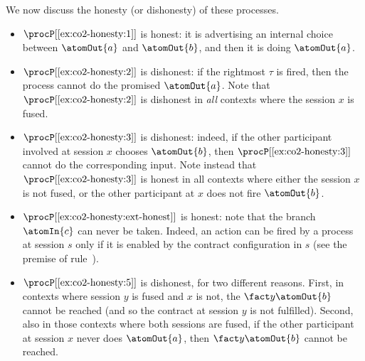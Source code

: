 \begin{example}
\begin{enumerate}
		
	\end{enumerate}
	We now discuss the honesty (or dishonesty) of these processes.
	\begin{itemize}
		
		\item $\procP[\ref*{ex:co2-honesty:1}]$ is honest:
		it is advertising an internal choice between $\atomOut{a}$ and $\atomOut{b}$,
		and then it is doing $\atomOut{a}$.
		
		\item $\procP[\ref*{ex:co2-honesty:2}]$ is dishonest:
		if the rightmost $\tau$ is fired, then the process cannot do the promised $\atomOut{a}$.
		Note that $\procP[\ref*{ex:co2-honesty:2}]$ is dishonest in \emph{all}
		contexts where the session $x$ is fused.
		
		\item $\procP[\ref*{ex:co2-honesty:3}]$ is dishonest:
		indeed, if the other participant involved at session $x$ chooses $\atomOut{b}$,
		then $\procP[\ref*{ex:co2-honesty:3}]$ cannot do the corresponding input.
		Note instead that $\procP[\ref*{ex:co2-honesty:3}]$ is honest in all 
		contexts where either the session $x$ is not fused,
		or the other participant at $x$ does not fire $\atomOut{b}$.
		
		\item $\procP[\ref*{ex:co2-honesty:ext-honest}]$ is honest:
		note that the branch $\atomIn{c}$ can never be taken.
		Indeed, an action can be fired by a process at session $s$
		only if it is enabled by the contract configuration in $s$
		(see the premise of rule~\nrule{[Do$\qmark$]}).
		
		\item $\procP[\ref*{ex:co2-honesty:5}]$ is dishonest,
		for two different reasons.
		First, in contexts where session $y$ is fused and $x$ is not, 
		the $\fact y {\atomOut{b}}$ cannot be reached 
		(and so the contract at session $y$ is not fulfilled).
		Second, also in those contexts where both sessions are fused,
		if the other participant at session $x$ never does $\atomOut{a}$,
		then $\fact y {\atomOut{b}}$ cannot be reached.
		

\end{itemize}
\end{example}
